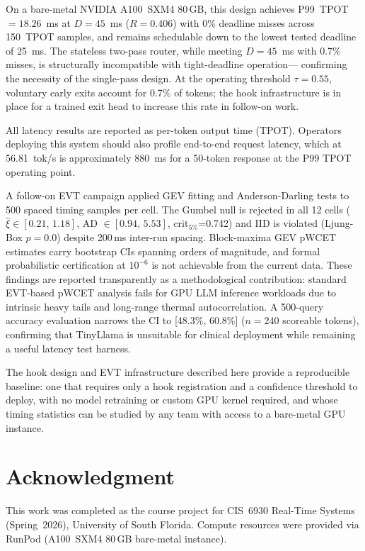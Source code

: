 \documentclass[conference]{IEEEtran}
\begin{document}
On a bare-metal NVIDIA A100~SXM4 80\,GB, this design achieves
P99~TPOT~$=18.26$~ms at $D=45$~ms ($R=0.406$) with 0\% deadline
misses across 150~TPOT samples, and remains schedulable down to
the lowest tested deadline of 25~ms.
The stateless two-pass router, while meeting $D=45$~ms with 0.7\%
misses, is structurally incompatible with tight-deadline operation---
confirming the necessity of the single-pass design.
At the operating threshold $\tau=0.55$, voluntary early exits account
for 0.7\% of tokens; the hook infrastructure is in place for a trained
exit head to increase this rate in follow-on work.

All latency results are reported as per-token output time (TPOT).
Operators deploying this system should also profile end-to-end request
latency, which at 56.81~tok/s is approximately 880~ms for a 50-token
response at the P99 TPOT operating point.

A follow-on EVT campaign applied GEV fitting and Anderson-Darling tests
to 500 spaced timing samples per cell.
The Gumbel null is rejected in all 12 cells ($\hat{\xi} \in [0.21,\,1.18]$,
AD $\in [0.94,\,5.53]$, crit$_{5\%}$=0.742) and IID is violated
(Ljung-Box $p{=}0.0$) despite 200\,ms inter-run spacing.
Block-maxima GEV pWCET estimates carry bootstrap CIs spanning orders
of magnitude, and formal probabilistic certification at $10^{-6}$ is
not achievable from the current data.
These findings are reported transparently as a methodological
contribution: standard EVT-based pWCET analysis fails for GPU LLM
inference workloads due to intrinsic heavy tails and long-range thermal
autocorrelation.
A 500-query accuracy evaluation narrows the CI to [48.3\%, 60.8\%]
($n{=}240$ scoreable tokens), confirming that TinyLlama is unsuitable
for clinical deployment while remaining a useful latency test harness.

The hook design and EVT infrastructure described here provide a
reproducible baseline: one that requires only a hook registration and
a confidence threshold to deploy, with no model retraining or custom
GPU kernel required, and whose timing statistics can be studied by any
team with access to a bare-metal GPU instance.

\section*{Acknowledgment}

This work was completed as the course project for CIS~6930 Real-Time
Systems (Spring~2026), University of South Florida.
Compute resources were provided via RunPod (A100~SXM4 80\,GB bare-metal
instance).



\end{document}
